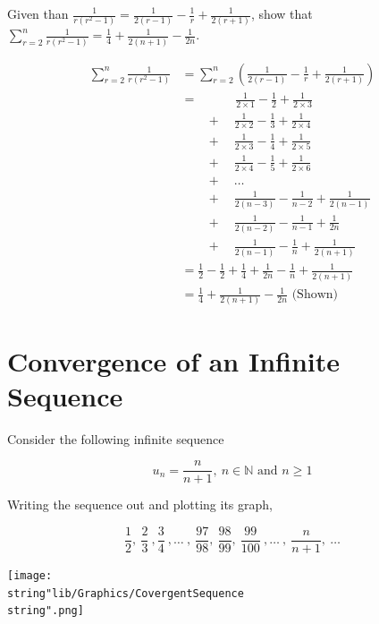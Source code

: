 \documentclass[11pt,a4paper]{book}
\newcommand{\N}{\mathbb{N}}
\begin{document}
\begin{example}

Given than ${\displaystyle \frac{1}{r\left(r^{2}-1\right)}=\frac{1}{2\left(r-1\right)}-\frac{1}{r}+\frac{1}{2\left(r+1\right)}}$,
show that ${\displaystyle \sum_{r=2}^{n}\frac{1}{r\left(r^{2}-1\right)}=\frac{1}{4}+\frac{1}{2\left(n+1\right)}-\frac{1}{2n}}$.

\Solution

\begin{align*}
\sum_{r=2}^{n}\frac{1}{r\left(r^{2}-1\right)} & =\sum_{r=2}^{n}\left(\frac{1}{2\left(r-1\right)}-\frac{1}{r}+\frac{1}{2\left(r+1\right)}\right)\\
 & =\qquad\quad\frac{1}{2\times1}-\frac{1}{2}+\frac{1}{2\times3}\\
 & \qquad+\quad\frac{1}{2\times2}-\frac{1}{3}+\frac{1}{2\times4}\\
 & \qquad+\quad\frac{1}{2\times3}-\frac{1}{4}+\frac{1}{2\times5}\\
 & \qquad+\quad\frac{1}{2\times4}-\frac{1}{5}+\frac{1}{2\times6}\\
 & \qquad+\quad\ldots\\
 & \qquad+\quad\frac{1}{2\left(n-3\right)}-\frac{1}{n-2}+\frac{1}{2\left(n-1\right)}\\
 & \qquad+\quad\frac{1}{2\left(n-2\right)}-\frac{1}{n-1}+\frac{1}{2n}\\
 & \qquad+\quad\frac{1}{2\left(n-1\right)}-\frac{1}{n}+\frac{1}{2\left(n+1\right)}\\
 & =\frac{1}{2}-\frac{1}{2}+\frac{1}{4}+\frac{1}{2n}-\frac{1}{n}+\frac{1}{2\left(n+1\right)}\\
 & =\frac{1}{4}+\frac{1}{2\left(n+1\right)}-\frac{1}{2n}\text{ (Shown)}
\end{align*}

\end{example}

\newpage{}

\section{Convergence of an Infinite Sequence}

Consider the following infinite sequence

\[
u_{n}=\frac{n}{n+1},\:n\in\N\text{ and }n\geq1
\]

Writing the sequence out and plotting its graph,

\begin{minipage}{0.5\textwidth}

\[
\frac{1}{2},\:\frac{2}{3}\:,\frac{3}{4}\:,\ldots\:,\:\frac{97}{98},\:\frac{98}{99},\:\frac{99}{100}\:,\ldots\:,\:\frac{n}{n+1},\:\ldots
\]

\end{minipage}
\begin{minipage}{0.5\textwidth}
\begin{center}
\texttt{[image: \\string"lib/Graphics/CovergentSequence\\string".png]}
\par\end{center}

\end{minipage}
\end{document}
